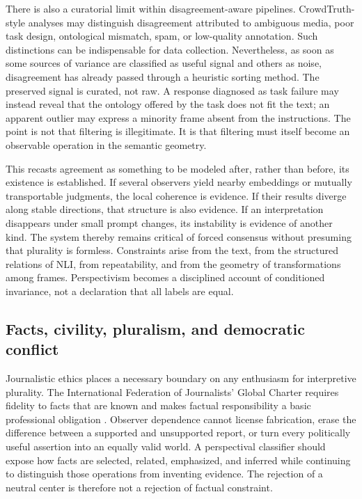 There is also a curatorial limit within disagreement-aware pipelines. CrowdTruth-style analyses may distinguish disagreement attributed to ambiguous media, poor task design, ontological mismatch, spam, or low-quality annotation. Such distinctions can be indispensable for data collection. Nevertheless, as soon as some sources of variance are classified as useful signal and others as noise, disagreement has already passed through a heuristic sorting method. The preserved signal is curated, not raw. A response diagnosed as task failure may instead reveal that the ontology offered by the task does not fit the text; an apparent outlier may express a minority frame absent from the instructions. The point is not that filtering is illegitimate. It is that filtering must itself become an observable operation in the semantic geometry.

This recasts agreement as something to be modeled after, rather than before, its existence is established. If several observers yield nearby embeddings or mutually transportable judgments, the local coherence is evidence. If their results diverge along stable directions, that structure is also evidence. If an interpretation disappears under small prompt changes, its instability is evidence of another kind. The system thereby remains critical of forced consensus without presuming that plurality is formless. Constraints arise from the text, from the structured relations of NLI, from repeatability, and from the geometry of transformations among frames. Perspectivism becomes a disciplined account of conditioned invariance, not a declaration that all labels are equal.

\subsection{Facts, civility, pluralism, and democratic conflict}

Journalistic ethics places a necessary boundary on any enthusiasm for interpretive plurality. The International Federation of Journalists' Global Charter requires fidelity to facts that are known and makes factual responsibility a basic professional obligation \citep{ifj2019}. Observer dependence cannot license fabrication, erase the difference between a supported and unsupported report, or turn every politically useful assertion into an equally valid world. A perspectival classifier should expose how facts are selected, related, emphasized, and inferred while continuing to distinguish those operations from inventing evidence. The rejection of a neutral center is therefore not a rejection of factual constraint.

